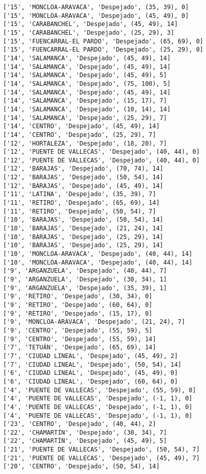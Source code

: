 \documentclass[11pt]{article}
\begin{document}
\begin{Verbatim}[commandchars=\\\{\}]
['15', 'MONCLOA-ARAVACA', 'Despejado', (35, 39), 0]
['15', 'MONCLOA-ARAVACA', 'Despejado', (45, 49), 0]
['15', 'CARABANCHEL', 'Despejado', (45, 49), 14]
['15', 'CARABANCHEL', 'Despejado', (25, 29), 3]
['15', 'FUENCARRAL-EL PARDO', 'Despejado', (65, 69), 0]
['15', 'FUENCARRAL-EL PARDO', 'Despejado', (25, 29), 0]
['14', 'SALAMANCA', 'Despejado', (45, 49), 14]
['14', 'SALAMANCA', 'Despejado', (45, 49), 14]
['14', 'SALAMANCA', 'Despejado', (45, 49), 5]
['14', 'SALAMANCA', 'Despejado', (75, 100), 5]
['14', 'SALAMANCA', 'Despejado', (45, 49), 14]
['14', 'SALAMANCA', 'Despejado', (15, 17), 7]
['14', 'SALAMANCA', 'Despejado', (10, 14), 14]
['14', 'SALAMANCA', 'Despejado', (25, 29), 7]
['14', 'CENTRO', 'Despejado', (45, 49), 14]
['14', 'CENTRO', 'Despejado', (25, 29), 7]
['12', 'HORTALEZA', 'Despejado', (18, 20), 7]
['12', 'PUENTE DE VALLECAS', 'Despejado', (40, 44), 0]
['12', 'PUENTE DE VALLECAS', 'Despejado', (40, 44), 0]
['12', 'BARAJAS', 'Despejado', (70, 74), 14]
['12', 'BARAJAS', 'Despejado', (50, 54), 14]
['12', 'BARAJAS', 'Despejado', (45, 49), 14]
['11', 'LATINA', 'Despejado', (35, 39), 7]
['11', 'RETIRO', 'Despejado', (65, 69), 14]
['11', 'RETIRO', 'Despejado', (50, 54), 7]
['10', 'BARAJAS', 'Despejado', (50, 54), 14]
['10', 'BARAJAS', 'Despejado', (21, 24), 14]
['10', 'BARAJAS', 'Despejado', (25, 29), 14]
['10', 'BARAJAS', 'Despejado', (25, 29), 14]
['10', 'MONCLOA-ARAVACA', 'Despejado', (40, 44), 14]
['10', 'MONCLOA-ARAVACA', 'Despejado', (40, 44), 14]
['9', 'ARGANZUELA', 'Despejado', (40, 44), 7]
['9', 'ARGANZUELA', 'Despejado', (30, 34), 1]
['9', 'ARGANZUELA', 'Despejado', (35, 39), 1]
['9', 'RETIRO', 'Despejado', (30, 34), 0]
['9', 'RETIRO', 'Despejado', (60, 64), 0]
['9', 'RETIRO', 'Despejado', (15, 17), 0]
['9', 'MONCLOA-ARAVACA', 'Despejado', (21, 24), 7]
['9', 'CENTRO', 'Despejado', (55, 59), 5]
['9', 'CENTRO', 'Despejado', (55, 59), 14]
['7', 'TETUÁN', 'Despejado', (65, 69), 14]
['7', 'CIUDAD LINEAL', 'Despejado', (45, 49), 2]
['7', 'CIUDAD LINEAL', 'Despejado', (50, 54), 14]
['6', 'CIUDAD LINEAL', 'Despejado', (45, 49), 0]
['6', 'CIUDAD LINEAL', 'Despejado', (60, 64), 0]
['4', 'PUENTE DE VALLECAS', 'Despejado', (55, 59), 0]
['4', 'PUENTE DE VALLECAS', 'Despejado', (-1, 1), 0]
['4', 'PUENTE DE VALLECAS', 'Despejado', (-1, 1), 0]
['4', 'PUENTE DE VALLECAS', 'Despejado', (-1, 1), 0]
['23', 'CENTRO', 'Despejado', (40, 44), 2]
['22', 'CHAMARTÍN', 'Despejado', (30, 34), 7]
['22', 'CHAMARTÍN', 'Despejado', (45, 49), 5]
['21', 'PUENTE DE VALLECAS', 'Despejado', (50, 54), 7]
['21', 'PUENTE DE VALLECAS', 'Despejado', (45, 49), 7]
['20', 'CENTRO', 'Despejado', (50, 54), 14]

\end{Verbatim}
\end{document}
